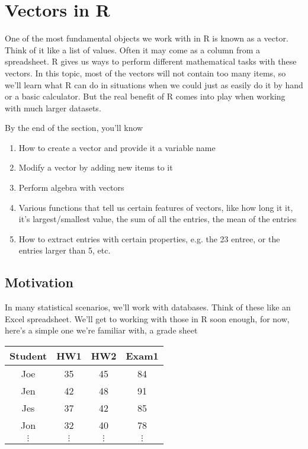 \section{Vectors in R}

One of the most fundamental objects we work with in R is known as a vector.  Think of it like a list of values. Often it may come as a column from a spreadsheet.  R gives us ways to perform different mathematical tasks with these vectors.  In this topic, most of the vectors will not contain too many items, so we'll learn what R can do in situations when we could just as easily do it by hand or a basic calculator.  But the real benefit of R comes into play when working with much larger datasets.

By the end of the section, you'll know 
\begin{enumerate}
\item How to create a vector and provide it a variable name
\item Modify a vector by adding new items to it
\item Perform algebra with vectors
\item Various functions that tell us certain features of vectors, like how long it it, it's largest/smallest value, the sum of all the entries, the mean of the entries
\item How to extract entries with certain properties, e.g. the 23 entree, or the entries larger than 5, etc.  
\end{enumerate}

\subsection{Motivation}

In many statistical scenarios, we'll work with databases. Think of these like an Excel
spreadsheet. We'll get to working with those in R soon enough, for 
now, here's a simple one we're familiar with, a grade sheet
\begin{center}
  \begin{tabular}{cccc}
    \textbf{Student} & \textbf{HW1} & \textbf{HW2} & \textbf{Exam1} \\
    \hline\hline
    Joe              & 35 & 45 & 84 \\
    Jen              & 42 & 48 & 91 \\
    Jes              & 37 & 42 & 85 \\
    Jon              & 32 & 40 & 78 \\
    $\vdots$ & $\vdots$ & $\vdots$ & $\vdots$ \\
  \end{tabular}
\end{center}

